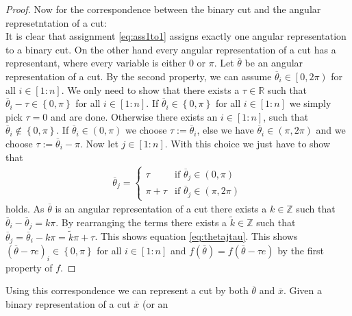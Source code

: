 \documentclass[12pt,a4paper]{article}
\theoremstyle{mythm}
\begin{document}
\begin{proof}
Now for the correspondence between the binary cut and the angular represetntation of a cut: \\
It is clear that assignment \ref{eq:ass1to1} assigns exactly one angular representation to a binary cut.
On the other hand every angular representation of a cut has a representant, where every variable is either $ 0 $ or $ \pi $.
Let $ \overline{ \theta}   $ be an angular representation of a cut. 
By the second property, we can assume $ \overline{ \theta}_i  \in \left[ 0, 2 \pi \right)  $ for all $ i \in \left[ 1:n \right]  $.
We only need to show that there exists a $ \tau \in \mathbb{R} $ such that $ \overline{ \theta }_i - \tau \in \left\{ 0, \pi  \right\}	$ for all $ i \in \left[ 1:n \right] $.
If $ \overline{ \theta } _{ i } \in \left\{ 0, \pi  \right\}  $ for all $ i \in \left[ 1:n \right]  $ we simply pick $ \tau = 0 $ and are done.
Otherwise there exists an $ i \in \left[ 1:n \right]  $, such that $ \overline{ \theta  }_i \notin \left\{ 0, \pi  \right\}  $. 
If $ \overline{ \theta }_i \in \left( 0 , \pi  \right)  $ we choose $ \tau := \overline{ \theta }_i  $, else we have $ \overline{ \theta } _{ i } \in \left( \pi , 2 \pi
\right)  $ and we choose $ \tau := \overline{ \theta } _{ i } - \pi $.
Now let $ j \in \left[ 1:n \right]  $. 
With this choice we just have to show that 
\begin{align}
\label{eq:thetajtau} 
 \overline{ \theta } _{ j } = \begin{cases}
 \tau  & \text{if } \overline{ \theta } _{ j } \in \left( 0, \pi \right) \\
 \pi + \tau  & \text{if } \overline{ \theta } _{ j } \in \left( \pi, 2 \pi \right) 
 \end{cases}
\end{align} 
holds.
As $ \overline{ \theta }  $ is an angular representation of a cut there exists a $ k \in \mathbb{Z} $ such that 
$ \overline{ \theta } _{ i } - \overline{ \theta } _{ j } = k \pi   $. By rearranging the terms there exists a $ \widetilde{ k } \in \mathbb{Z} $ such that  
$ \overline{ \theta } _{ j } = \overline{ \theta } _{ i } - k \pi = \widetilde{ k } \pi + \tau $.
This shows equation \ref{eq:thetajtau}. 
This shows $ \left( \overline{ \theta } - \tau e  \right) _{ i } \in \left\{ 0, \pi  \right\}  $ for all $ i \in \left[ 1:n \right]  $ and $ f ( \overline{ \theta } ) = f (
\overline{ \theta } - \tau e )   $ by the first property of $ f $.
\end{proof}
Using this correspondence we can represent a cut by both $ \overline{ \theta }  $ and $ \overline{ x }  $. Given a binary representation of a cut $ \overline{ x }  $ (or an
\end{document}
